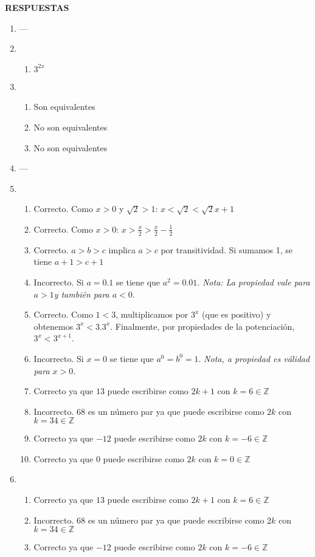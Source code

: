 \documentclass[a4paper]{article}
\newcommand{\exercise}{\item}
\begin{document}
 \textbf{RESPUESTAS}\begin{enumerate}\exercise---\exercise\begin{enumerate} [label=(\alph*)]		\item $3^{2x}$
\end{enumerate}\exercise\begin{enumerate} [label=(\alph*)]		\item Son equivalentes
		\item No son equivalentes
		\item No son equivalentes
\end{enumerate}\exercise---\exercise\begin{enumerate} [label=(\alph*)]		\item Correcto. Como $x>0$ y $\sqrt{2}>1$: $x < \sqrt{2} < \sqrt{2} x +1$
		\item Correcto. Como $x>0$: $x > \displaystyle\frac{x}{2} > \displaystyle\frac{x}{2}-\displaystyle\frac{1}{2}$ 
		\item	Correcto. $a>b>c$ implica $a>c$ por transitividad. Si sumamos 1, se tiene $a+1>c+1$
		\item Incorrecto. Si $a=0.1$ se tiene que $a^2=0.01$. \textit{Nota: La propiedad vale para $a>1$y también para $a<0$.}
		\item Correcto. Como $1 < 3$, multiplicamos por $3^{x}$ (que es positivo) y obtenemos $3^{x} < 3.3^{x}$. Finalmente, por propiedades de la potenciación, $3^{x} < 3^{x+1}$.
		\item Incorrecto. Si $x=0$ se tiene que $a^0=b^0=1$. \textit{Nota, a propiedad es válidad para $x>0$.}
		\item Correcto ya que $13$ puede escribirse como $2k+1$ con $k=6 \in \mathbb{Z}$
		\item Incorrecto. $68$ es un número par ya que puede escribirse como $2k$ con $k=34 \in \mathbb{Z}$
		\item Correcto ya que $-12$ puede escribirse como $2k$ con $k=-6 \in \mathbb{Z}$
		\item Correcto ya que $0$ puede escribirse como $2k$ con $k=0 \in \mathbb{Z}$
\end{enumerate}\exercise\begin{enumerate} [label=(\alph*)]		\item Correcto ya que $13$ puede escribirse como $2k+1$ con $k=6 \in \mathbb{Z}$
		\item Incorrecto. $68$ es un número par ya que puede escribirse como $2k$ con $k=34 \in \mathbb{Z}$
		\item Correcto ya que $-12$ puede escribirse como $2k$ con $k=-6 \in \mathbb{Z}$

\end{enumerate}
\end{enumerate}
\end{document}
